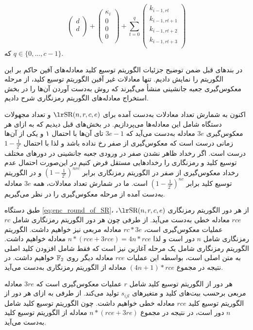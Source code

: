 \begin{itemize}
$$\begin{pmatrix}
	d\\
	d\\
	\end{pmatrix} + 
	\begin{pmatrix}
	\kappa_{i}\\
	0\\
	0\\
	0\\
	\end{pmatrix} + 
	\sum_{t = 0}^{q}
	\begin{pmatrix}
	k_{i-1,rt}\\
	k_{i-1,rt+1}\\
	k_{i-1,rt+2}\\
	k_{i-1,rt+3}\\
	\end{pmatrix}
	$$
	که 
	$q\in \{0,...,c-1\}$.
\end{itemize}
در بندهای قبل ضمن توضیح  جزئیات الگوریتم توسیع کلید معادله‌های آفین حاکم بر این الگوریتم را نمایش دادیم. تنها معادلات غیر آفین الگوریتم توسیع کلید، از مرحله معکوس‌گیری جعبه جانشینی منشأ می‌گیرند که روش به‌دست آوردن آن‌ها را در بخش استخراج معادله‌های الگوریتم رمزنگاری شرح دادیم. 

اکنون به شمارش تعداد معادلات به‌دست آمده برای 
$\text{\en{SR}}(n,r,c,e)$
 و تعداد مجهولات دستگاه شامل این معادله‌ها می‌پردازیم. در بخش‌های قبل دیدیم که به ازای هر معکوس‌گیری 
 $3e$
 معادله به‌دست می‌آید که 
 $3e-1$
 تای آن‌ها با احتمال ۱ و یکی از آن‌ها زمانی درست است که معکوس‌گیری از صفر رخ نداده باشد و لذا با احتمال 
 $1-\frac{1}{2^{e}}$
 درست است. اگر رخداد ظاهر نشدن صفر در ورودی جعبه جانشینی در دورهای مختلف توسیع کلید و رمزنگاری را رخدادهایی مستقل فرض کنیم در این‌صورت احتمال عدم رخداد معکوس‌گیری از صفر در الگوریتم رمزنگاری برابر 
 $(1-\frac{1}{2^{e}})^{nrc}$
 و در الگوریتم توسیع کلید برابر 
 $(1-\frac{1}{2^{e}})^{nc}$
 است. ما در شمارش تعداد معادلات، همه 
 $3e$
معادله به‌دست آمده از مرحله معکوس‌گیری را در نظر می‌گیریم. 

طبق دستگاه 
\ref{eq:enc_round_of_SR}، 
از هر دور  الگوریتم رمزنگاری 
$\text{\en{SR}}(n,r,c,e)$، 
$rce$
معادله خطی به‌دست می‌آید. از طرفی چون هر دور الگوریتم رمزنگاری شامل 
$rc$
عملیات معکوس‌گیری است، 
$rc*3e$
معادله مربعی نیز خواهیم داشت.  الگوریتم رمزنگاری شامل
$n$
دور است و لذا 
$n*(rce + 3rce) = 4n*rce$
معادله خواهیم داشت. الگوریتم رمزنگاری شامل یک مرحله آغازین نیز است  که فقط شامل افزودن کلید اصلی به متن اصلی است، بواسطه این  عملیات 
$rce$
معادله دیگر روی 
$\mathbb{F}_{2}$
خواهیم داشت. در نتیجه در مجموع 
$(4n+1)*rce$
 معادله از الگوریتم رمزنگاری به‌دست می‌آید. 
 
هر دور از الگوریتم توسیع کلید شامل 
$r$
عملیات معکوس‌گیری است که 
$3re$
معادله مربعی برحسب بیت‌های کلید و متغیرهای 
$s_{ijl}$
تولید می‌کند. از طرفی به ازای هر دور از الگوریتم توسیع کلید 
$rce$
معادله خطی خواهیم داشت. چون الگوریتم توسیع کلید شامل 
$n$ 
دور است، در نتیجه در مجموع 
$n*(rce+3re)$
معادله از الگوریتم توسیع کلید به‌دست می‌آید. 

